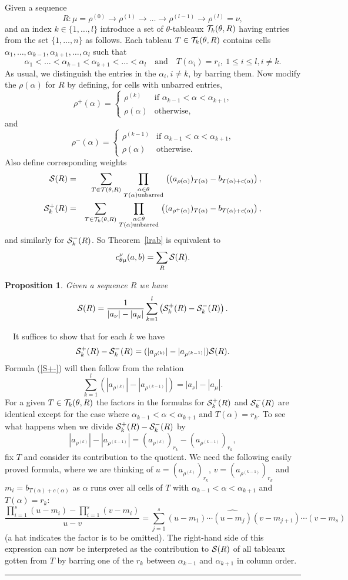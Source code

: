 \documentclass[titlepage,12pt]{article}
\newcommand{\bpr}{\begin{prop}}
\newcommand{\epr}{\end{prop}}
\newcommand{\barr}{\begin{array}}
\newcommand{\earr}{\end{array}}
\newcommand{\beq}{\begin{equation}}
\newcommand{\eeq}{\end{equation}}
\newcommand{\bea}{\begin{eqnarray*}}
\newcommand{\eea}{\end{eqnarray*}}
\newcommand{\Qed}{\rule{1ex}{1ex} \medskip}
\newcommand{\qmq}[1]{\quad\mbox{#1}\quad}
\newcommand{\case}[4]{\left\{\barr{ll}#1&\mbox{#2}\\#3&\mbox{#4}\earr\right.
}
\newcommand{\al}{\alpha}
\renewcommand{\th}{\theta}
\newcommand{\0}{{\bf 0}}
\newcommand{\1}{{\bf 1}}
\newcommand{\2}{{\bf 2}}
\newcommand{\3}{{\bf 3}}
\newcommand{\4}{{\bf 4}}
\newcommand{\5}{{\bf 5}}
\newcommand{\6}{{\bf 6}}
\newcommand{\7}{{\bf 7}}
\newcommand{\8}{{\bf 8}}
\newcommand{\9}{{\bf 9}}
\newcommand{\cS}{{\cal S}}
\newcommand{\cT}{{\cal T}}
\newcommand{\scl}{\scriptstyle}
\newcommand{\scz}{\scriptsize}
\newcommand{\Proof}{\noindent{\bf Proof.}\ \ }
\newtheorem{prop}[thm]{Proposition}
\begin{document}
Given a sequence 
$$
R: \mu=\rho^{(0)}\to\rho^{(1)}\to
\ldots\to\rho^{(l-1)}\to\rho^{(l)}=\nu,
$$
and an index $k\in\{1,\dots,l\}$ introduce a set of $\theta$-tableaux
$\cT_k(\theta,R)$ having entries from the set $\{1,\ldots,n\}$ as follows.
Each tableau $T\in \cT_k(\theta,R)$ contains cells
$\al_1,\dots,\al_{k-1},\al_{k+1},\dots,\al_l$ such that
$$
\al_1<\ldots<\al_{k-1}<\al_{k+1}<\ldots<\al_l\qmq{and}T(\al_i)=r_i,\ 1\le
i\le l,i\neq k.
$$
As usual, we distinguish the entries in  the $\al_i, i\neq k$, by
barring them.  Now modify the $\rho(\al)$ for $R$ by defining, for 
cells with unbarred entries,
$$
\rho^{+}(\alpha)=
\case{\rho^{(k)}}{if $\al_{k-1}<\al<\al_{k+1}$,}{\rho(\al)}{otherwise,}
$$
and
$$
\rho^{-}(\alpha)=
\case{\rho^{(k-1)}}{if $\al_{k-1}<\al<\al_{k+1}$,}{\rho(\al)}{otherwise.}
$$
Also define corresponding weights
\bea
\cS(R)&=&
\sum_{T\in\cT(\th,R)}\prod_{\scl\al\in\th\atop\scl T(\al)\mbox{\scz
unbarred}}
\left((a_{\rho(\alpha)})_{T(\alpha)}-b_{T(\alpha)+c(\alpha)}\right),\\
\cS_k^{+}(R)&=&
\sum_{T\in\cT_k(\th,R)}\prod_{\scl\al\in\th\atop\scl T(\al)\mbox{\scz
unbarred}}
\left((a_{\rho^{+}(\alpha)})_{T(\alpha)}-b_{T(\alpha)+c(\alpha)}\right),
\eea
and similarly for $\cS_k^-(R)$.  So Theorem~\ref{lrab} is equivalent to
\beq							\label{SR}
c_{\th\mu}^\nu(a,b)=\sum_R \cS(R).
\eeq

\bpr
Given a sequence $R$ we have
\beq							\label{S+-}
\cS(R)=\frac{1}{|a_{\nu}|-|a_{\mu}|}
\sum_{k=1}^l \left(\cS_k^{+}(R)-\cS_k^{-}(R)\right). 
\eeq
\epr

\Proof  It suffices to show that for each $k$ we have
$$
\cS_k^{+}(R)-\cS_k^{-}(R)=(|a_{\rho^{(k)}}|-|a_{\rho^{(k-1)}}|)\cS(R).
$$
Formula (\ref{S+-}) will then follow from the relation
$$
\sum_{k=1}^l(|a_{\rho^{(k)}}|-|a_{\rho^{(k-1)}}|)=|a_{\nu}|-|a_{\mu}|.
$$
For a given $T\in\cT_k(\th,R)$ the factors in the formulas for
$\cS_k^{+}(R)$
and $\cS_k^{-}(R)$ are identical except for the case where
$\al_{k-1}<\al<\al_{k+1}$ and $T(\alpha)=r_k$. 
To see what happens when we divide $\cS_k^{+}(R)-\cS_k^{-}(R)$ by
$$
|a_{\rho^{(k)}}|-|a_{\rho^{(k-1)}}|=(a_{\rho^{(k)}})_{r_k}-(a_{\rho^{(k-1)}}
)_{r_k},
$$
fix $T$ and consider its contribution to the quotient.   We need the
following easily proved formula, where we are thinking of
$u=(a_{\rho^{(k)}})_{r_k}$, $v=(a_{\rho^{(k-1)}})_{r_k}$ and
$m_i=b_{T(\al)+c(\al)}$ as $\al$ runs over 
all cells of $T$ with $\al_{k-1}<\al<\al_{k+1}$ and $T(\al)=r_k$:
$$
\frac{\prod_{i=1}^s (u-m_i)-\prod_{i=1}^s (v-m_i)}{u-v}=
\sum_{j=1}^s (u-m_1)\cdots\widehat{(u-m_j)}(v-m_{j+1})\cdots(v-m_s)
$$
(a hat indicates the factor is to be omitted). The right-hand side
of this expression can now be interpreted as the contribution to
$\cS(R)$ of all tableaux gotten from $T$ by barring one of the $r_k$
between
$\al_{k-1}$ and $\al_{k+1}$ in column order.\hfill \Qed
\end{document}

